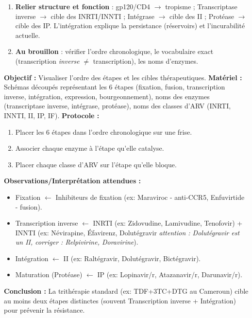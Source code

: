 \documentclass[11pt]{article}
\begin{document}
\begin{methode}
\begin{enumerate}
\begin{enumerate}
\end{enumerate}
\item \textbf{Relier structure et fonction} : gp120/CD4 $\rightarrow$ tropisme ; Transcriptase inverse $\rightarrow$ cible des INRTI/INNTI ; Intégrase $\rightarrow$ cible des II ; Protéase $\rightarrow$ cible des IP. L'intégration explique la persistance (réservoirs) et l'incurabilité actuelle.
\item \textbf{Au brouillon} : vérifier l'ordre chronologique, le vocabulaire exact (transcription \emph{inverse} $\neq$ transcription), les noms d'enzymes.
\end{enumerate}
\end{methode}

\begin{experience}
\textbf{Objectif :} Visualiser l'ordre des étapes et les cibles thérapeutiques.
\textbf{Matériel :} Schémas découpés représentant les 6 étapes (fixation, fusion, transcription inverse, intégration, expression, bourgeonnement), noms des enzymes (transcriptase inverse, intégrase, protéase), noms des classes d'ARV (INRTI, INNTI, II, IP, IF).
\textbf{Protocole :}
\begin{enumerate}
\item Placer les 6 étapes dans l'ordre chronologique sur une frise.
\item Associer chaque enzyme à l'étape qu'elle catalyse.
\item Placer chaque classe d'ARV sur l'étape qu'elle bloque.
\end{enumerate}
\textbf{Observations/Interprétation attendues :}
\begin{itemize}
\item Fixation $\leftarrow$ Inhibiteurs de fixation (ex: Maraviroc - anti-CCR5, Enfuvirtide - fusion).
\item Transcription inverse $\leftarrow$ INRTI (ex: Zidovudine, Lamivudine, Tenofovir) + INNTI (ex: Névirapine, Éfavirenz, Dolutégravir \emph{attention : Dolutégravir est un II, corriger : Relpivirine, Doravirine}).
\item Intégration $\leftarrow$ II (ex: Raltégravir, Dolutégravir, Bictégravir).
\item Maturation (Protéase) $\leftarrow$ IP (ex: Lopinavir/r, Atazanavir/r, Darunavir/r).
\end{itemize}
\textbf{Conclusion :} La trithérapie standard (ex: TDF+3TC+DTG au Cameroun) cible au moins deux étapes distinctes (souvent Transcription inverse + Intégration) pour prévenir la résistance.
\end{experience}
\end{document}
